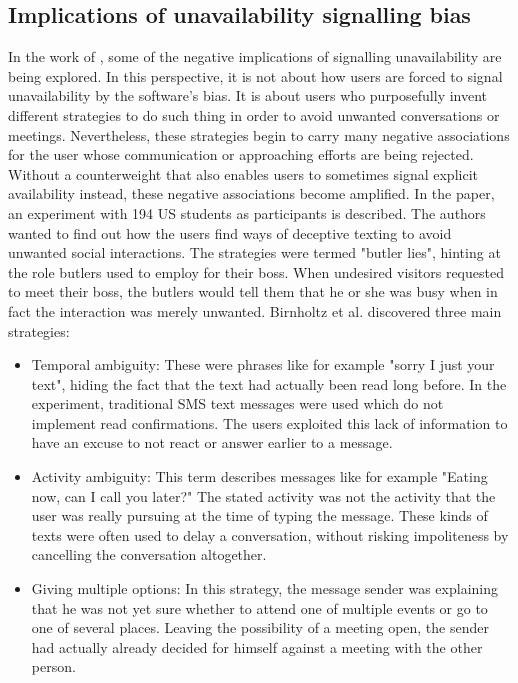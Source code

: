 \documentclass{CML_Seminar_Template}
\begin{document}
\subsection{Implications of unavailability signalling bias}
In the work of \cite[]{Birnholtz2010}, some of the negative implications of signalling unavailability are being explored. In this perspective, it is not about how users are forced to signal unavailability by the software's bias. It is about users who purposefully invent different strategies to do such thing in order to avoid unwanted conversations or meetings. Nevertheless, these strategies begin to carry many negative associations for the user whose communication or approaching efforts are being rejected. Without a counterweight that also enables users to sometimes signal explicit availability instead, these negative associations become amplified.
In the paper, an experiment with 194 US students as participants is described. The authors wanted to find out how the users find ways of deceptive texting to avoid unwanted social interactions. The strategies were termed "butler lies", hinting at the role butlers used to employ for their boss. When 
undesired visitors requested to meet their boss, the butlers would tell them that he or she was busy when in fact the interaction was merely unwanted. Birnholtz et al. discovered three main strategies:
\begin{itemize}
	\item Temporal ambiguity: These were phrases like for example "sorry I just your text", hiding the fact that the text had actually been read long before. In the experiment, traditional SMS text messages were used which do not implement read confirmations. The users exploited this lack of information to have an excuse to not react or answer earlier to a message.
	\item Activity ambiguity: This term describes messages like for example "Eating now, can I call you later?" The stated activity was not the activity that the user was really pursuing at the time of typing the message. These kinds of texts were often used to delay a conversation, without risking impoliteness by cancelling the conversation altogether.
	\item Giving multiple options: In this strategy, the message sender was explaining that he was not yet sure whether to attend one of multiple events or go to one of several places. Leaving the possibility of a meeting open, the sender had actually already decided for himself against a meeting with the other person.
\end{itemize}
\end{document}
